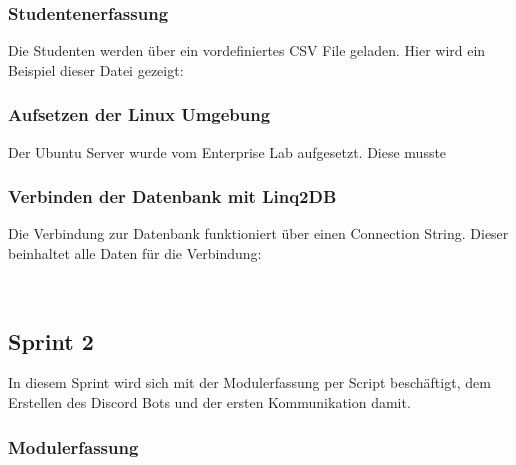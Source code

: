 \documentclass[a4paper, table]{article}
\begin{document}
\subsubsection{Studentenerfassung}

Die Studenten werden über ein vordefiniertes CSV File geladen.
Hier wird ein Beispiel dieser Datei gezeigt:





\subsubsection{Aufsetzen der Linux Umgebung}

Der Ubuntu Server wurde vom Enterprise Lab aufgesetzt.
Diese musste 



\subsubsection{Verbinden der Datenbank mit Linq2DB}

Die Verbindung zur Datenbank funktioniert über einen Connection String.
Dieser beinhaltet alle Daten für die Verbindung:

\begin{lstlisting}
    
\end{lstlisting}

\newpage
\subsection{Sprint 2}
In diesem Sprint wird sich mit der Modulerfassung per Script beschäftigt, 
dem Erstellen des Discord Bots und der ersten Kommunikation damit.

\subsubsection{Modulerfassung}
\end{document}
